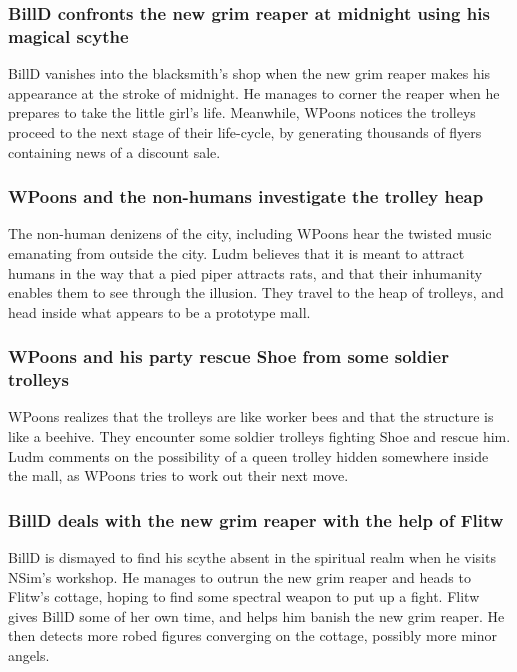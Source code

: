 \subsubsection{\Gls{BillD} confronts the new grim reaper at midnight using his magical scythe}
\Gls{BillD} vanishes into the blacksmith's shop when the new grim reaper makes his appearance at
the stroke of midnight. He manages to corner the reaper when he prepares to take the little girl's
life. Meanwhile, \Gls{WPoons} notices the trolleys proceed to the next stage of their life-cycle,
by generating thousands of flyers containing news of a discount sale.

\subsubsection{\Gls{WPoons} and the non-humans investigate the trolley heap}
The non-human denizens of the city, including \Gls{WPoons} hear the twisted music emanating from
outside the city. \Gls{Ludm} believes that it is meant to attract humans in the way that a pied
piper attracts rats, and that their inhumanity enables them to see through the illusion. They
travel to the heap of trolleys, and head inside what appears to be a prototype mall.

\subsubsection{\Gls{WPoons} and his party rescue \Gls{Shoe} from some soldier trolleys}
\Gls{WPoons} realizes that the trolleys are like worker bees and that the structure is like a
beehive. They encounter some soldier trolleys fighting \Gls{Shoe} and rescue him. \Gls{Ludm}
comments on the possibility of a queen trolley hidden somewhere inside the mall, as \Gls{WPoons}
tries to work out their next move.

\subsubsection{\Gls{BillD} deals with the new grim reaper with the help of \Gls{Flitw}}
\Gls{BillD} is dismayed to find his scythe absent in the spiritual realm when he visits \Gls{NSim}'s
workshop. He manages to outrun the new grim reaper and heads to \Gls{Flitw}'s cottage, hoping to
find some spectral weapon to put up a fight. \Gls{Flitw} gives \Gls{BillD} some of her own time,
and helps him banish the new grim reaper. He then detects more robed figures converging on the
cottage, possibly more minor angels.


